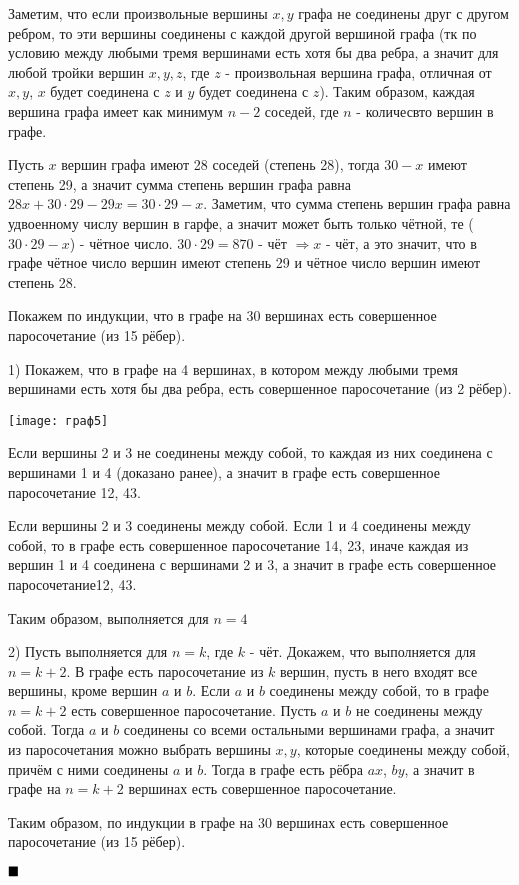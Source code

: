 \documentclass[a4paper, 16pt]{article}
\newenvironment{proof}[1][Доказательство]{%
	\begin{trivlist}
		\item[\hskip \labelsep {\bfseries #1:}]
		\item \hspace{14pt}
	}{
		$ \hfill\blacksquare $
	\end{trivlist}
	\hfill\break
}
\begin{document}
			\begin{proof}
				Заметим, что если произвольные вершины $x, y$ графа не соединены друг с другом ребром, то эти вершины соединены с каждой другой вершиной графа (тк по условию между любыми тремя вершинами есть хотя
				бы два ребра, а значит для любой тройки вершин $x,y, z$, где $z$ - произвольная вершина графа, отличная от $x, y$, $x$ будет соединена с $z$ и $y$ будет соединена с $z$). Таким образом, каждая вершина графа имеет как минимум $n-2$ соседей, где $n$ - количесвто вершин в графе. 
				
				Пусть $x$ вершин графа имеют 28 соседей (степень 28), тогда $30-x$ имеют степень 29, а значит сумма степень вершин графа равна $28x+30\cdot29-29x=30\cdot29-x$. Заметим, что сумма степень вершин графа равна удвоенному числу вершин в гарфе, а значит может быть только чётной, те ($30\cdot29-x$) - чётное число. $30\cdot29=870$ - чёт $\Rightarrow x$ - чёт, а это значит, что в графе чётное число вершин имеют степень 29 и чётное число вершин имеют степень 28. 
				
				Покажем по индукции, что в графе на 30 вершинах есть совершенное паросочетание (из 15 рёбер). 
				
				1) Покажем, что в графе на 4 вершинах, в котором между любыми тремя вершинами есть хотя бы два ребра, есть совершенное паросочетание (из 2 рёбер).
				
				\texttt{[image: граф5]}
				
				Если вершины 2 и 3 не соединены между собой, то каждая из них соединена с вершинами 1 и 4 (доказано ранее), а значит в графе есть совершенное паросочетание 12, 43.
				
				Если вершины 2 и 3 соединены между собой. Если 1 и 4 соединены между собой, то в графе есть совершенное паросочетание 14, 23, иначе каждая из вершин 1 и 4 соединена с вершинами 2 и 3, а значит в графе есть совершенное паросочетание12, 43.
					
				Таким образом, выполняется для $n=4$
				
				2) Пусть выполняется для $n=k$, где $k$ - чёт. Докажем, что выполняется для $n=k + 2$. В графе есть паросочетание из $k$ вершин, пусть в него входят все вершины, кроме вершин $a$ и $b$. Если $a$ и $b$ соединены между собой, то в графе $n=k + 2$ есть совершенное паросочетание. Пусть $a$ и $b$ не соединены между собой. Тогда $a$ и $b$ соединены со всеми остальными вершинами графа, а значит из паросочетания можно выбрать вершины $x, y$, которые соединены между собой, причём с ними соединены $a$ и $b$. Тогда в графе есть рёбра $ax$, $by$, а значит в графе на $n=k + 2$ вершинах есть совершенное паросочетание.
				
				Таким образом, по индукции в графе на 30 вершинах есть совершенное паросочетание (из 15 рёбер). 
			\end{proof}
\end{document}
